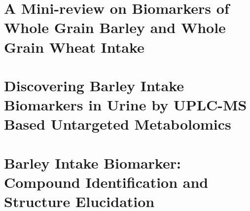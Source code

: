 \documentclass[]{report}
\begin{document}
%

\chapter{A Mini-review on Biomarkers of Whole Grain Barley and Whole Grain Wheat Intake}
	
	
	
	
	

\chapter{Discovering Barley Intake Biomarkers in Urine by UPLC-MS Based Untargeted Metabolomics}
	

\chapter{Barley Intake Biomarker: Compound Identification and Structure Elucidation}

\end{document}

